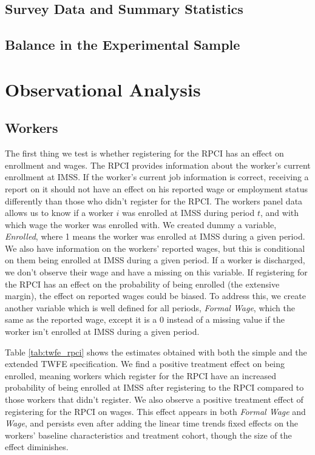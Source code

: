 \documentclass[oneside,11pt]{article}
\begin{document}
\subsection{Survey Data and Summary Statistics}

\subsection{Balance in the Experimental Sample}

\section{Observational Analysis} \label{observational}

\subsection{Workers} \label{subsec:workers}

The first thing we test is whether registering for the RPCI has an effect on enrollment and wages. The RPCI provides information about the worker's current enrollment at IMSS. If the worker's current job information is correct, receiving a report on it should not have an effect on his reported wage or employment status differently than those who didn't register for the RPCI. The workers panel data allows us to know if a worker $i$ was enrolled at IMSS during period $t$, and with which wage the worker was enrolled with. We created dummy a variable, \textit{Enrolled}, where 1 means the worker was enrolled at IMSS during a given period. We also have information on the workers' reported wages, but this is conditional on them being enrolled at IMSS during a given period. If a worker is discharged, we don't observe their wage and have a missing on this variable. If registering for the RPCI has an effect on the probability of being enrolled (the extensive margin), the effect on reported wages could be biased. To address this, we create another variable which is well defined for all periods, \textit{Formal Wage}, which the same as the reported wage, except it is a 0 instead of a missing value if the worker isn't enrolled at IMSS during a given period. 

Table \ref{tab:twfe_rpci} shows the estimates obtained with both the simple and the extended TWFE specification. We find a positive treatment effect on being enrolled, meaning workers which register for the RPCI have an increased probability of being enrolled at IMSS after registering to the RPCI compared to those workers that didn't register. We also observe a positive treatment effect of registering for the RPCI on wages. This effect appears in both \textit{Formal Wage} and \textit{Wage}, and persists even after adding the linear time trends fixed effects on the workers' baseline characteristics and treatment cohort, though the size of the effect diminishes. 
\end{document}
